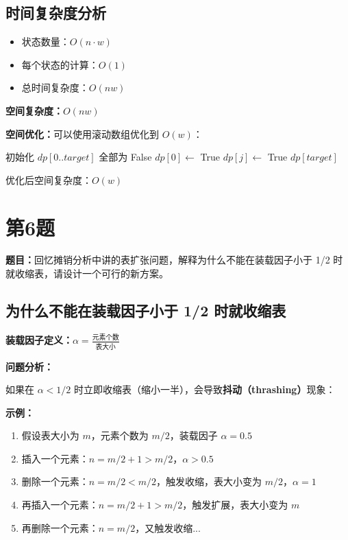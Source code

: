 \documentclass[UTF8,12pt,a4paper]{ctexart}
\begin{document}
\subsection*{时间复杂度分析}

\begin{itemize}
	\item 状态数量：$O(n \cdot w)$
	\item 每个状态的计算：$O(1)$
	\item 总时间复杂度：$O(nw)$
\end{itemize}

\textbf{空间复杂度：}$O(nw)$

\textbf{空间优化：}可以使用滚动数组优化到 $O(w)$：

\begin{algorithm}[H]
	\caption{空间优化版本}
	\begin{algorithmic}[1]
		\State 初始化 $dp[0..target]$ 全部为 False
		\State $dp[0] \gets$ True
			 
					\State $dp[j] \gets$ True
				\EndIf
			\EndFor
		\EndFor
		\State \Return $dp[target]$
	\end{algorithmic}
\end{algorithm}

优化后空间复杂度：$O(w)$


\section*{第6题}
\textbf{题目：}回忆摊销分析中讲的表扩张问题，解释为什么不能在装载因子小于 1/2 时就收缩表，请设计一个可行的新方案。

\subsection*{为什么不能在装载因子小于 1/2 时就收缩表}

\textbf{装载因子定义：}$\alpha = \frac{\text{元素个数}}{\text{表大小}}$

\textbf{问题分析：}

如果在 $\alpha < 1/2$ 时立即收缩表（缩小一半），会导致\textbf{抖动（thrashing）}现象：

\textbf{示例：}
\begin{enumerate}
	\item 假设表大小为 $m$，元素个数为 $m/2$，装载因子 $\alpha = 0.5$
	\item 插入一个元素：$n = m/2 + 1 > m/2$，$\alpha > 0.5$
	\item 删除一个元素：$n = m/2 < m/2$，触发收缩，表大小变为 $m/2$，$\alpha = 1$
	\item 再插入一个元素：$n = m/2 + 1 > m/2$，触发扩展，表大小变为 $m$
	\item 再删除一个元素：$n = m/2$，又触发收缩...
\end{enumerate}
\end{document}
